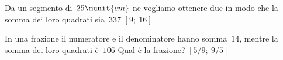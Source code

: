 \begin{htmulticols}{2}
\begin{esercizio}[*]
 \label{ese:3.126}
Da un segmento di~\(25\munit{cm}\) ne vogliamo ottenere due in modo che la 
somma dei loro quadrati sia~\(337\)
\hfill\(\left[9;~16\right]\)
\end{esercizio}

\begin{esercizio}[*]
 \label{ese:3.127}
In una frazione il numeratore e il denominatore hanno somma~\(14\), mentre 
la somma dei loro quadrati è~\(106\) Qual è la frazione?
\hfill\(\left[5/9;~9/5\right]\)
\end{esercizio}

\begin{comment}

\begin{esercizio}[*]
 \label{ese:3.128}
Due navi partono contemporaneamente da uno stesso porto e arrivano alla
stessa destinazione dopo aver percorso sulla stessa rotta a velocità
costante~\(720\munit{miglia}\) Sapendo che una delle due navi viaggia con 
una 
velocità
di 1 nodo (1 miglio all'ora) superiore a quella dell'altra nave e che 
perciò
arriva 3 ore prima a destinazione, determina le velocità in nodi delle due
navi.
\hfill\(\left[15;~16\right]\)
\end{esercizio}

\begin{esercizio}
 \label{ese:3.129}
Due navi che viaggiano su rotte perpendicolari a velocità costante si
incontrano in mare aperto. Sapendo che una delle navi viaggia a 15 nodi (1
nodo = 1 miglio all'ora), dopo quanto tempo le due navi si trovano alla
distanza di 40 miglia?
\hfill\(\left[...\right]\)
\end{esercizio}

\begin{esercizio}
 \label{ese:3.130}
Luca e Carlo bevono due aranciate in bottiglia. Nel tempo in cui Luca beve
11 sorsi, Carlo ne beve 8, ma due sorsi di Carlo equivalgono a tre di 
Luca.
Quando Carlo inizia a bere Luca ha già preso 4 sorsi. Dopo quanti sorsi di
Carlo le due bibite hanno lo stesso livello?
\hfill\(\left[...\right]\)
\end{esercizio}

\begin{esercizio}
 \label{ese:3.131}
Un maratoneta durante un allenamento fa due giri di un percorso 
di~\(22\munit{km} 
\)
mantenendo in ciascun giro una velocità costante ma nel secondo giro la
velocità è inferiore di~\(0,5\munit{km/h}\) rispetto al primo giro. A 
quali 
velocità
ha corso se ha impiegato complessivamente 2 ore e un quarto?
\hfill\(\left[...\right]\)
\end{esercizio}


\end{comment}
\end{htmulticols}
